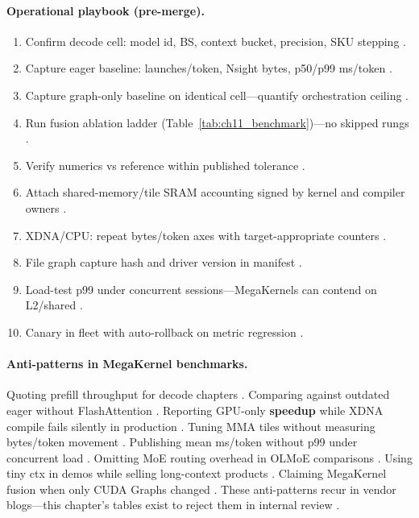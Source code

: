 \paragraph{Operational playbook (pre-merge).}
\begin{enumerate}
\item Confirm decode cell: model id, BS, context bucket, precision, SKU stepping \citep{patel2025llminference,taxbreak2026}.
\item Capture eager baseline: launches/token, Nsight bytes, p50/p99 ms/token \citep{memoryfloor2026,dao2022flashattention}.
\item Capture graph-only baseline on identical cell---quantify orchestration ceiling \citep{nvidia2024cudagraphs,memoryfloor2026}.
\item Run fusion ablation ladder (Table~\ref{tab:ch11_benchmark})---no skipped rungs \citep{taxbreak2026,yirage2026}.
\item Verify numerics vs reference within published tolerance \citep{dao2022flashattention,dlbook}.
\item Attach shared-memory/tile SRAM accounting signed by kernel and compiler owners \citep{semianalysis2024tma,amd2024aie}.
\item XDNA/CPU: repeat bytes/token axes with target-appropriate counters \citep{amd2024xdna,dlbook,chen2020compilerbasedhardw}.
\item File graph capture hash and driver version in manifest \citep{nvidia2024cudagraphs,kwon2023vllm}.
\item Load-test p99 under concurrent sessions---MegaKernels can contend on L2/shared \citep{patel2025llminference,memoryfloor2026}.
\item Canary in fleet with auto-rollback on metric regression \citep{taxbreak2026,liu2024deepseekv3}.
\end{enumerate}

\paragraph{Anti-patterns in MegaKernel benchmarks.} Quoting prefill throughput for decode chapters \citep{dao2023flashdecoding,patel2025llminference}. Comparing against outdated eager without FlashAttention \citep{dao2022flashattention,taxbreak2026}. Reporting GPU-only \textbf{speedup} while XDNA compile fails silently in production \citep{amd2024aie,yirage2026}. Tuning MMA tiles without measuring bytes/token movement \citep{memoryfloor2026,semianalysis2024tma}. Publishing mean ms/token without p99 under concurrent load \citep{kwon2023vllm,memoryfloor2026}. Omitting MoE routing overhead in OLMoE comparisons \citep{taxbreak2026,liu2024deepseekv3}. Using tiny ctx in demos while selling long-context products \citep{dao2023flashdecoding,kwon2023vllm}. Claiming MegaKernel fusion when only CUDA Graphs changed \citep{memoryfloor2026,nvidia2024cudagraphs}. These anti-patterns recur in vendor blogs---this chapter's tables exist to reject them in internal review \citep{patel2025llminference,chen2020compilerbasedhardw}.


